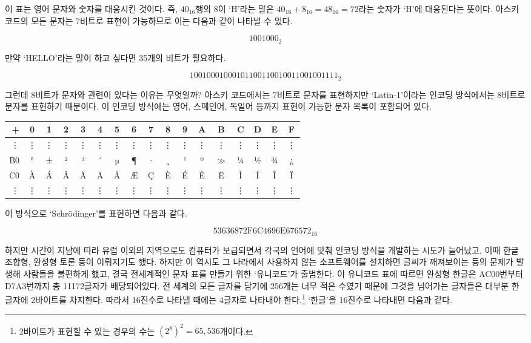 \documentclass{article}
\begin{document}
이 표는 영어 문자와 숫자를 대응시킨 것이다. 즉, $40_{16}$행의 8이 `H'라는 말은
$40_{16}+8_{16} = 48_{16} = 72$라는
숫자가 `H'에 대응된다는 뜻이다. 아스키 코드의 모든 문자는 7비트로 표현이 가능하므로 이는 다음과
같이 나타낼 수 있다.

$$
1001000_2
$$

만약 `HELLO'라는 말이 하고 싶다면 35개의 비트가 필요하다.

$$
1001000 1000101 1001100 1001100 1001111 _2
$$

그런데 8비트가 문자와 관련이 있다는 이유는 무엇일까?
아스키 코드에서는 7비트로 문자를 표현하지만 `Latin-1'이라는 인코딩 방식에서는 8비트로 문자를
표현하기 때문이다. 이 인코딩 방식에는 영어, 스페인어, 독일어 등까지 표현이 가능한 문자 목록이
포함되어 있다.

\begin{center}
    \begin{tabular}{r|cccccccccccccccc}
        + & 0 & 1 & 2 & 3 & 4 & 5 & 6 & 7 & 8 & 9 & A & B & C & D & E & F \\
        \hline
        \vdots & \vdots & \vdots & \vdots & \vdots & \vdots & \vdots & \vdots & \vdots & \vdots & \vdots & \vdots & \vdots & \vdots & \vdots & \vdots & \vdots \\
        B0 & ° & ± & ² & ³ & ´ & µ & ¶ & · & ¸ & ¹ & º & $\gg$ & ¼ & ½ & ¾ & ¿ \\
        C0 & À & Á & Â & Ã & Ä & Å & Æ & Ç & È & É & Ê & Ë & Ì & Í & Î & Ï \\
        \vdots & \vdots & \vdots & \vdots & \vdots & \vdots & \vdots & \vdots & \vdots & \vdots & \vdots & \vdots & \vdots & \vdots & \vdots & \vdots & \vdots
    \end{tabular}
\end{center}

이 방식으로 `Schrödinger'를 표현하면 다음과 같다.

$$
\text{53636872F6C4696E676572}_{16}
$$

하지만 시간이 지남에 따라 유럽 이외의 지역으로도 컴퓨터가 보급되면서 각국의 언어에 맞춰 인코딩
방식을 개발하는 시도가 늘어났고, 이때 한글 조합형, 완성형 토론 등이 이뤄지기도 했다.
하지만 이 역시도 그 나라에서 사용하지 않는 소프트웨어를 설치하면 글씨가 깨져보이는 등의 문제가
발생해 사람들을 불편하게 했고, 결국 전세계적인 문자 표를 만들기 위한 `유니코드'가 출범한다.
이 유니코드 표에 따르면 완성형 한글은 AC00번부터 D7A3번까지 총 11172글자가 배당되어있다.
전 세계의 모든 글자를 담기에 256개는 너무 적은 수였기 때문에 그것을 넘어가는 글자들은 대부분
한 글자에 2바이트를 차지한다. 따라서 16진수로 나타낼 때에는 4글자로 나타내야
한다.\footnote{2바이트가 표현할 수 있는 경우의 수는 $(2^8)^2 = 65,536$개이다.}
`한글'을 16진수로 나타내면 다음과 같다.
\end{document}
